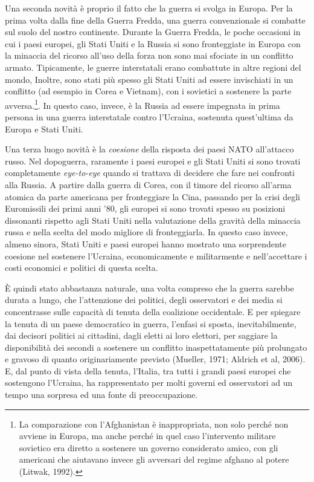 \documentclass[
]{book}
\begin{document}
Una seconda novità è proprio il fatto che la guerra si svolga in Europa. Per la prima volta dalla fine della Guerra Fredda, una guerra convenzionale si combatte sul suolo del nostro continente. Durante la Guerra Fredda, le poche occasioni in cui i paesi europei, gli Stati Uniti e la Russia si sono fronteggiate in Europa con la minaccia del ricorso all'uso della forza non sono mai sfociate in un conflitto armato. Tipicamente, le guerre interstatali erano combattute in altre regioni del mondo, Inoltre, sono stati più spesso gli Stati Uniti ad essere invischiati in un conflitto (ad esempio in Corea e Vietnam), con i sovietici a sostenere la parte avversa.\footnote{La comparazione con l'Afghanistan è inappropriata, non solo perché non avviene in Europa, ma anche perché in quel caso l'intervento militare sovietico era diretto a sostenere un governo considerato amico, con gli americani che aiutavano invece gli avversari del regime afghano al potere (Litwak, 1992).}. In questo caso, invece, è la Russia ad essere impegnata in prima persona in una guerra interstatale contro l'Ucraina, sostenuta quest'ultima da Europa e Stati Uniti.

Una terza luogo novità è la \emph{coesione} della risposta dei paesi NATO all'attacco russo. Nel dopoguerra, raramente i paesi europei e gli Stati Uniti si sono trovati completamente \emph{eye-to-eye} quando si trattava di decidere che fare nei confronti alla Russia. A partire dalla guerra di Corea, con il timore del ricorso all'arma atomica da parte americana per fronteggiare la Cina, passando per la crisi degli Euromissili dei primi anni '80, gli europei si sono trovati spesso su posizioni dissonanti rispetto agli Stati Uniti nella valutazione della gravità della minaccia russa e nella scelta del modo migliore di fronteggiarla. In questo caso invece, almeno sinora, Stati Uniti e paesi europei hanno mostrato una sorprendente coesione nel sostenere l'Ucraina, economicamente e militarmente e nell'accettare i costi economici e politici di questa scelta.

È quindi stato abbastanza naturale, una volta compreso che la guerra sarebbe durata a lungo, che l'attenzione dei politici, degli osservatori e dei media si concentrasse sulle capacità di tenuta della coalizione occidentale. E per spiegare la tenuta di un paese democratico in guerra, l'enfasi si sposta, inevitabilmente, dai decisori politici ai cittadini, dagli eletti ai loro elettori, per saggiare la disponibilità dei secondi a sostenere un conflitto inaspettatamente più prolungato e gravoso di quanto originariamente previsto (Mueller, 1971; Aldrich et al, 2006). E, dal punto di vista della tenuta, l'Italia, tra tutti i grandi paesi europei che sostengono l'Ucraina, ha rappresentato per molti governi ed osservatori ad un tempo una sorpresa ed una fonte di preoccupazione.
\end{document}
